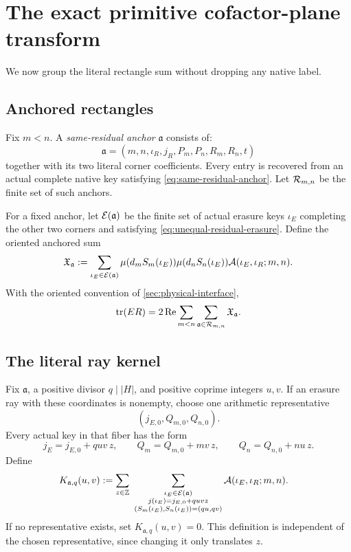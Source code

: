 \section{The exact primitive cofactor-plane transform}
\label{sec:cofactor-plane}

We now group the literal rectangle sum without dropping any native label.

\subsection{Anchored rectangles}

Fix \(m<n\).  A \emph{same-residual anchor}
\(\mathfrak a\) consists of:
\[
 \mathfrak a
 =
 (m,n,\iota_R,j_R,P_m,P_n,R_m,R_n,t)
\]
together with its two literal corner coefficients.  Every entry is
recovered from an actual complete native key satisfying
\eqref{eq:same-residual-anchor}.  Let \(\mathcal R_{m,n}\) be the finite set of
such anchors.

For a fixed anchor, let \(\mathcal E(\mathfrak a)\) be the finite set of actual
erasure keys \(\iota_E\) completing the other two corners and satisfying
\eqref{eq:unequal-residual-erasure}.  Define the oriented anchored sum
\begin{equation}
 \mathfrak X_{\mathfrak a}
 :=
 \sum_{\iota_E\in\mathcal E(\mathfrak a)}
 \mu(d_mS_m(\iota_E))
 \mu(d_nS_n(\iota_E))
 \mathcal A(\iota_E,\iota_R;m,n).
 \label{eq:anchored-rectangle-sum}
\end{equation}
With the oriented convention of \cref{sec:physical-interface},
\begin{equation}
 \operatorname{tr}(ER)
 =
 2\operatorname{Re}
 \sum_{m<n}\sum_{\mathfrak a\in\mathcal R_{m,n}}
 \mathfrak X_{\mathfrak a}.
 \label{eq:trace-by-anchors}
\end{equation}

\subsection{The literal ray kernel}

Fix \(\mathfrak a\), a positive divisor \(q\mid |H|\), and positive
coprime integers \(u,v\).  If an erasure ray with these coordinates is
nonempty, choose one arithmetic representative
\[
 (j_{E,0},Q_{m,0},Q_{n,0}).
\]
Every actual key in that fiber has the form
\[
 j_E=j_{E,0}+quv\,z,\qquad
 Q_m=Q_{m,0}+mv\,z,\qquad
 Q_n=Q_{n,0}+nu\,z.
\]
Define
\begin{equation}
\begin{aligned}
 K_{\mathfrak a,q}(u,v)
 &:=
 \sum_{z\in\mathbb Z}
 \ \sum_{\substack{\iota_E\in\mathcal E(\mathfrak a)\\
                    j(\iota_E)=j_{E,0}+quv z\\
                    (S_m(\iota_E),S_n(\iota_E))=(qu,qv)}}
 \mathcal A(\iota_E,\iota_R;m,n).
\end{aligned}
\label{eq:literal-ray-kernel}
\end{equation}
If no representative exists, set \(K_{\mathfrak a,q}(u,v)=0\).
This definition is independent of the chosen representative, since
changing it only translates \(z\).

